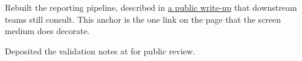 \documentclass[medium=screen, fontsize=12pt, margin=normal]{careerdossier-resume}
\begin{document}
\MakeCDossierHeader
{}
\begin{CDossierEntry}[
  title        = {Principal Data Scientist},
  organization = {Example Research Laboratory},
  location     = {Toronto, Ontario},
  dates        = {September 2024--Present}
]
  \begin{CDossierItemize}
    \item Rebuilt the reporting pipeline, described in
          \href{https://example.org/programs/analytics-modernization}{a public
          write-up} that downstream teams still consult. This anchor is the one
          link on the page that the screen medium does decorate.
    \item Deposited the validation notes at
          for public review.
  \end{CDossierItemize}
\end{CDossierEntry}
\end{document}
